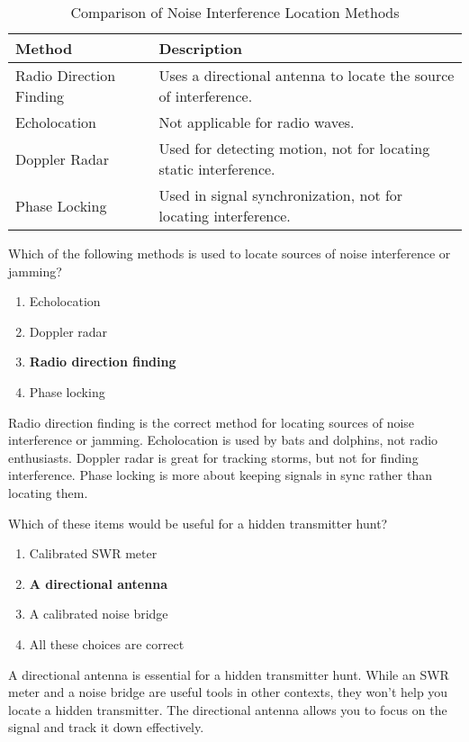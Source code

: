\begin{table}[h]
    \centering
    \begin{tabular}{|l|l|}
        \hline
        \textbf{Method} & \textbf{Description} \\
        \hline
        Radio Direction Finding & Uses a directional antenna to locate the source of interference. \\
        \hline
        Echolocation & Not applicable for radio waves. \\
        \hline
        Doppler Radar & Used for detecting motion, not for locating static interference. \\
        \hline
        Phase Locking & Used in signal synchronization, not for locating interference. \\
        \hline
    \end{tabular}
    \caption{Comparison of Noise Interference Location Methods}
    \label{tab:noise-interference-methods}
\end{table}

\begin{tcolorbox}[colback=gray!10!white,colframe=black!75!black,title={T8C01}]
    Which of the following methods is used to locate sources of noise interference or jamming?
    \begin{enumerate}[label=\Alph*),noitemsep]
        \item Echolocation
        \item Doppler radar
        \item \textbf{Radio direction finding}
        \item Phase locking
    \end{enumerate}
\end{tcolorbox}

Radio direction finding is the correct method for locating sources of noise interference or jamming. Echolocation is used by bats and dolphins, not radio enthusiasts. Doppler radar is great for tracking storms, but not for finding interference. Phase locking is more about keeping signals in sync rather than locating them.

\begin{tcolorbox}[colback=gray!10!white,colframe=black!75!black,title={T8C02}]
    Which of these items would be useful for a hidden transmitter hunt?
    \begin{enumerate}[label=\Alph*),noitemsep]
        \item Calibrated SWR meter
        \item \textbf{A directional antenna}
        \item A calibrated noise bridge
        \item All these choices are correct
    \end{enumerate}
\end{tcolorbox}

A directional antenna is essential for a hidden transmitter hunt. While an SWR meter and a noise bridge are useful tools in other contexts, they won't help you locate a hidden transmitter. The directional antenna allows you to focus on the signal and track it down effectively.

